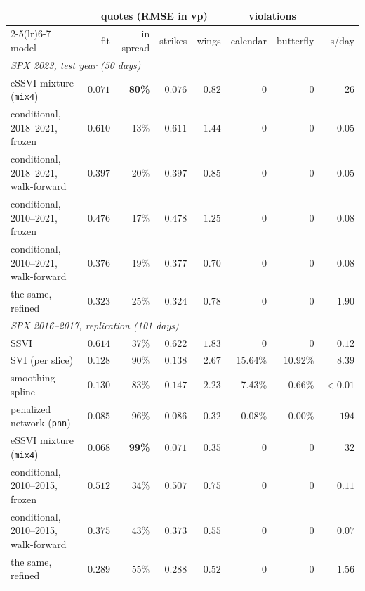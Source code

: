 \begin{tabular}{lrrrrrrr}
\toprule
& \multicolumn{4}{c}{quotes (RMSE in vp)} & \multicolumn{2}{c}{violations} & \\
\cmidrule(lr){2-5}\cmidrule(lr){6-7}
model & fit & in spread & strikes & wings & calendar & butterfly & s/day \\
\midrule
\multicolumn{8}{l}{\emph{SPX 2023, test year (50 days)}} \\
eSSVI mixture (\texttt{mix4}) & $\mathbf{0.071}$ & \textbf{80\%} & $\mathbf{0.076}$ & $0.82$ & 0 & 0 & $26$ \\
conditional, 2018--2021, frozen & $0.610$ & 13\% & $0.611$ & $1.44$ & 0 & 0 & $0.05$ \\
conditional, 2018--2021, walk-forward & $0.397$ & 20\% & $0.397$ & $0.85$ & 0 & 0 & $0.05$ \\
conditional, 2010--2021, frozen & $0.476$ & 17\% & $0.478$ & $1.25$ & 0 & 0 & $0.08$ \\
conditional, 2010--2021, walk-forward & $0.376$ & 19\% & $0.377$ & $\mathbf{0.70}$ & 0 & 0 & $0.08$ \\
\quad the same, refined & $0.323$ & 25\% & $0.324$ & $0.78$ & 0 & 0 & $1.90$ \\
\midrule
\multicolumn{8}{l}{\emph{SPX 2016--2017, replication (101 days)}} \\
SSVI & $0.614$ & 37\% & $0.622$ & $1.83$ & 0 & 0 & $0.12$ \\
SVI (per slice) & $0.128$ & 90\% & $0.138$ & $2.67$ & 15.64\% & 10.92\% & $8.39$ \\
smoothing spline & $0.130$ & 83\% & $0.147$ & $2.23$ & 7.43\% & 0.66\% & $<0.01$ \\
penalized network (\texttt{pnn}) & $0.085$ & 96\% & $0.086$ & $\mathbf{0.32}$ & 0.08\% & 0.00\% & $194$ \\
eSSVI mixture (\texttt{mix4}) & $\mathbf{0.068}$ & \textbf{99\%} & $\mathbf{0.071}$ & $0.35$ & 0 & 0 & $32$ \\
conditional, 2010--2015, frozen & $0.512$ & 34\% & $0.507$ & $0.75$ & 0 & 0 & $0.11$ \\
conditional, 2010--2015, walk-forward & $0.375$ & 43\% & $0.373$ & $0.55$ & 0 & 0 & $0.07$ \\
\quad the same, refined & $0.289$ & 55\% & $0.288$ & $0.52$ & 0 & 0 & $1.56$ \\
\bottomrule
\end{tabular}
